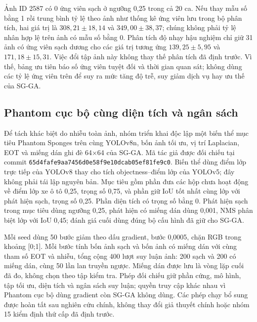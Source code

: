 \documentclass[a4paper,fleqn]{cas-dc}
\begin{document}
Ảnh ID 2587 có 0 ứng viên sạch ở ngưỡng 0,25 trong cả 20 ca. Nếu thay mẫu số bằng 1 rồi trung bình tỷ lệ theo ảnh như thống kê ứng viên lưu trong bộ phân tích, hai giá trị là $308{,}21\pm18{,}14$ và $349{,}00\pm38{,}37$; chúng không phải tỷ lệ nhân hợp lệ trên ảnh có mẫu số bằng 0. Phân tích độ nhạy hậu nghiệm chỉ giữ 31 ảnh có ứng viên sạch dương cho các giá trị tương ứng $139{,}25\pm5{,}95$ và $171{,}18\pm15{,}31$. Việc đổi tập ảnh này không thay thế phân tích đã định trước. Vì thế, bảng ưu tiên báo số ứng viên tuyệt đối và thời gian quan sát; không dùng các tỷ lệ ứng viên trên để suy ra mức tăng độ trễ, suy giảm dịch vụ hay ưu thế của SG-GA.

\subsection{Phantom cục bộ cùng diện tích và ngân sách}

Để tách khác biệt do nhiễu toàn ảnh, nhóm triển khai độc lập một biến thể mục tiêu Phantom Sponges \cite{shapira2023} trên cùng YOLOv8n, bốn ảnh tối ưu, vị trí Laplacian, EOT và miếng dán ghi đè 64×64 của SG-GA. Mã tác giả được đối chiếu tại commit \texttt{65d4fafe9aa7456d0e58f9e10dcab05ef81fe9c0}. Biến thể dùng điểm lớp trực tiếp của YOLOv8 thay cho tích objectness--điểm lớp của YOLOv5; đây không phải tái lập nguyên bản. Mục tiêu gồm phần đưa các hộp chưa hoạt động về điểm lớp xe ô tô 0,25, trọng số 0,75, và phần giữ IoU tốt nhất cùng lớp với phát hiện sạch, trọng số 0,25. Phần diện tích có trọng số bằng 0. Phát hiện sạch trong mục tiêu dùng ngưỡng 0,25, phát hiện có miếng dán dùng 0,001, NMS phân biệt lớp với IoU 0,45; đánh giá cuối dùng đúng bộ cấu hình đã giữ cho SG-GA.

Mỗi seed dùng 50 bước giảm theo dấu gradient, bước 0,0005, chặn RGB trong khoảng [0;1]. Mỗi bước tính bốn ảnh sạch và bốn ảnh có miếng dán với cùng tham số EOT và nhiễu, tổng cộng 400 lượt suy luận ảnh: 200 sạch và 200 có miếng dán, cùng 50 lần lan truyền ngược. Miếng dán được lưu là vòng lặp cuối đã đo, không chọn theo tập kiểm tra. Phép đối chiếu giữ phần cứng, mô hình, tập tối ưu, diện tích và ngân sách suy luận; quyền truy cập khác nhau vì Phantom cục bộ dùng gradient còn SG-GA không dùng. Các phép chạy bổ sung được hoàn tất sau nghiên cứu chính, không thay đổi giả thuyết chính hoặc nhóm 15 kiểm định thứ cấp đã định trước.
\end{document}
